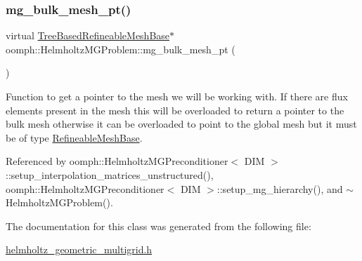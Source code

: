 \subsubsection{\texorpdfstring{mg\+\_\+bulk\+\_\+mesh\+\_\+pt()}{mg\_bulk\_mesh\_pt()}}
{\footnotesize\ttfamily virtual \hyperlink{classoomph_1_1TreeBasedRefineableMeshBase}{Tree\+Based\+Refineable\+Mesh\+Base}$\ast$ oomph\+::\+Helmholtz\+M\+G\+Problem\+::mg\+\_\+bulk\+\_\+mesh\+\_\+pt (\begin{DoxyParamCaption}{ }\end{DoxyParamCaption})\hspace{0.3cm}{\ttfamily [pure virtual]}}



Function to get a pointer to the mesh we will be working with. If there are flux elements present in the mesh this will be overloaded to return a pointer to the bulk mesh otherwise it can be overloaded to point to the global mesh but it must be of type \hyperlink{classoomph_1_1RefineableMeshBase}{Refineable\+Mesh\+Base}. 



Referenced by oomph\+::\+Helmholtz\+M\+G\+Preconditioner$<$ D\+I\+M $>$\+::setup\+\_\+interpolation\+\_\+matrices\+\_\+unstructured(), oomph\+::\+Helmholtz\+M\+G\+Preconditioner$<$ D\+I\+M $>$\+::setup\+\_\+mg\+\_\+hierarchy(), and $\sim$\+Helmholtz\+M\+G\+Problem().



The documentation for this class was generated from the following file\+:\begin{DoxyCompactItemize}
\item 
\hyperlink{helmholtz__geometric__multigrid_8h}{helmholtz\+\_\+geometric\+\_\+multigrid.\+h}\end{DoxyCompactItemize}
